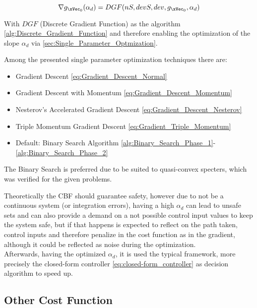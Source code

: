 \begin{equation}
    \nabla g_{\xVec_0}(\alpha_d) = DGF(nS,devS,dev, g_{\xVec_0},\alpha_d)  
    \label{eq:discrete_gradient_function}
\end{equation}

With \(DGF\) (Discrete Gradient Function) as the algorithm \ref{alg:Discrete_Gradient_Function}  and therefore enabling the optimization of the slope \(\alpha_d\) via \ref{sec:Single_Parameter_Optmization}.\par
Among the presented single parameter optimization techniques there are:

\begin{itemize}
    \item Gradient Descent \eqref{eq:Gradient_Descent_Normal}
    \item Gradient Descent with Momentum \eqref{eq:Gradient_Descent_Momentum}
    \item Nesterov's Accelerated Gradient Descent \eqref{eq:Gradient_Descent_Nesterov}
    \item Triple Momentum Gradient Descent \eqref{eq:Gradient_Triple_Momentum}
    \item Default: Binary Search Algorithm \ref{alg:Binary_Search_Phase_1}-\ref{alg:Binary_Search_Phase_2}
\end{itemize}

The Binary Search is preferred due to be suited to quasi-convex specters, which was verified for the given problems.\par 
Theoretically the CBF should guarantee safety, however due to not be a continuous system (or integration errors), having a high \(\alpha_d\) can lead to unsafe sets and can also provide a demand on a not possible control input values to keep the system safe, but if that happens is expected to reflect on the path taken, control inputs and therefore penalize in the cost function as in the gradient, although it could be reflected as noise during the optimization.\\

Afterwards, having the optimized \(\alpha_d\), it is used the typical  framework, more precisely the closed-form controller \eqref{eq:closed-form_controller} as decision algorithm to speed up.



\subsection{Other Cost Function}
\label{subsubsec:Other Cost Function}

